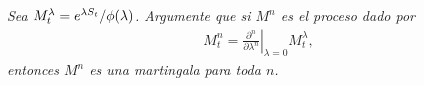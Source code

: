 \emph{
	Sea $M^\lambda_t=e^{\lambda S_t}/\phi\!\left( \lambda\right) $. Argumente que si $M^n$ es el proceso dado por
	\null
	\begin{align}
		M^n_t=\left.\frac{\partial^n}{\partial \lambda^n}\right|_{\lambda=0}M^\lambda_t,
	\end{align}
	\null
	entonces $M^n$ es una martingala para toda $n$.
}

\afterstatement\pn